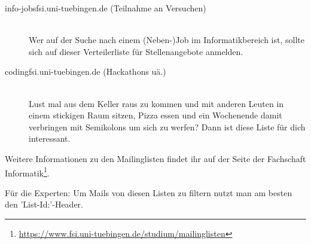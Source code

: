 \begin{description}
  \item[info-jobs\At fsi.uni-tuebingen.de (Teilnahme an Versuchen)] ~\\
Wer auf der Suche nach einem (Neben-)Job im Informatikbereich ist, sollte sich auf dieser Verteilerliste für Stellenangebote anmelden.
  
  \item[coding\At fsi.uni-tuebingen.de (Hackathons uä.)] ~\\
  Lust mal aus dem Keller raus zu kommen und mit anderen Leuten in einem stickigen Raum sitzen, Pizza essen und ein Wochenende damit verbringen mit Semikolons um sich zu werfen? Dann ist diese Liste für dich interessant.
  
  

\end{description}

Weitere Informationen zu den Mailinglisten findet ihr auf der Seite der Fachschaft Informatik\footnote{\url{https://www.fsi.uni-tuebingen.de/studium/mailinglisten}}.	%

Für die Experten: Um Mails von diesen Listen zu filtern nutzt man am besten den 'List-Id:'-Header.

\vfill
